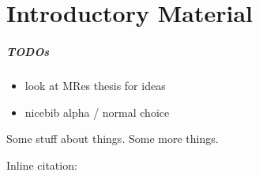 

\chapter{Introductory Material}
\label{chapterlabel1}

\paragraph{TODOs}

\begin{itemize}
	\item look at MRes thesis for ideas
	\item nicebib alpha / normal choice
\end{itemize}
Some stuff about things.\cite{example-citation} Some more things. 

Inline citation: 

\blindmathpaper
